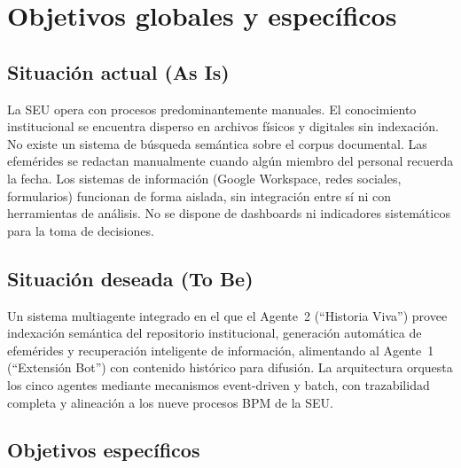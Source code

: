 \documentclass[a4paper, 12pt]{article}
\begin{document}
\section{Objetivos globales y espec\'ificos}

\subsection{Situaci\'on actual (As Is)}

La \ac{SEU} opera con procesos predominantemente manuales. El conocimiento institucional se encuentra disperso en archivos f\'isicos y digitales sin indexaci\'on. No existe un sistema de b\'usqueda sem\'antica sobre el corpus documental. Las efem\'erides se redactan manualmente cuando alg\'un miembro del personal recuerda la fecha. Los sistemas de informaci\'on (Google Workspace, redes sociales, formularios) funcionan de forma aislada, sin integraci\'on entre s\'i ni con herramientas de an\'alisis. No se dispone de dashboards ni indicadores sistem\'aticos para la toma de decisiones.

\subsection{Situaci\'on deseada (To Be)}

Un sistema multiagente integrado en el que el Agente~2 (``Historia Viva'') provee indexaci\'on sem\'antica del repositorio institucional, generaci\'on autom\'atica de efem\'erides y recuperaci\'on inteligente de informaci\'on, alimentando al Agente~1 (``Extensi\'on Bot'') con contenido hist\'orico para difusi\'on. La arquitectura orquesta los cinco agentes mediante mecanismos event-driven y batch, con trazabilidad completa y alineaci\'on a los nueve procesos \ac{BPM} de la \ac{SEU}.

\subsection{Objetivos espec\'ificos}
\end{document}

